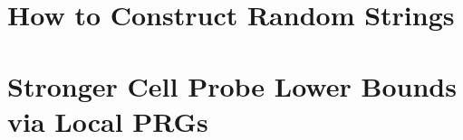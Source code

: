 \documentclass[12pt]{report}
\begin{document}
\chapter{How to Construct Random Strings}\label{chap:randomstrings}


\chapter{Stronger Cell Probe Lower Bounds via Local PRGs}\label{chap:cellprobe}


% 

\clearpage
{}
{}
\begin{singlespace}
\printbibliography[title={References}]
\end{singlespace}


\end{document}
